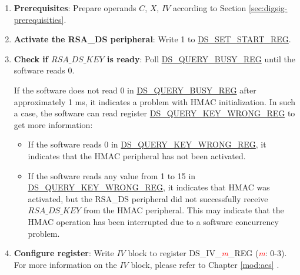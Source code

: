 \documentclass[main\_\_EN.tex]{subfiles}
\begin{document}
\begin{enumerate}

    \item {\bfseries Prerequisites}: Prepare operands \begin{math}C\end{math}, \begin{math}X\end{math}, \begin{math}IV\end{math} according to Section \ref{sec:digsig-prerequisities}.

    \item {\bfseries Activate the RSA\_DS peripheral}: Write 1 to \hyperref[regdesc:DSSETSTARTREG]{DS\_SET\_START\_REG}.

    \item {\bfseries Check if \begin{math}RSA\_DS\_KEY\end{math} is ready}: Poll \hyperref[regdesc:DSQUERYBUSYREG]{DS\_QUERY\_BUSY\_REG} until the software reads 0.

    If the software does not read 0 in \hyperref[regdesc:DSQUERYBUSYREG]{DS\_QUERY\_BUSY\_REG} after approximately 1 ms, it indicates a problem with HMAC initialization. In such a case, the software can read register \hyperref[regdesc:DSQUERYKEYWRONGREG]{DS\_QUERY\_KEY\_WRONG\_REG} to get more information:

    \begin{itemize}

        \item If the software reads 0 in \hyperref[regdesc:DSQUERYKEYWRONGREG]{DS\_QUERY\_KEY\_WRONG\_REG}, it indicates that the HMAC peripheral has not been activated.

        \item If the software reads any value from 1 to 15 in \hyperref[regdesc:DSQUERYKEYWRONGREG]{DS\_QUERY\_KEY\_WRONG\_REG}, it indicates that HMAC was activated, but the RSA\_DS peripheral did not successfully receive \begin{math}RSA\_DS\_KEY\end{math} from the HMAC peripheral. This may indicate that the HMAC operation has been interrupted due to a software concurrency problem.

    \end{itemize}

    \item {\bfseries Configure register}: Write \begin{math}IV\end{math} block to register DS\_IV\_\textcolor{red}{\it{m}}\_REG (\textcolor{red}{\it{m}}: 0-3). For more information on the \begin{math}IV\end{math} block, please refer to Chapter \ref{mod:aes} \textit{}.


\end{enumerate}
\end{document}
